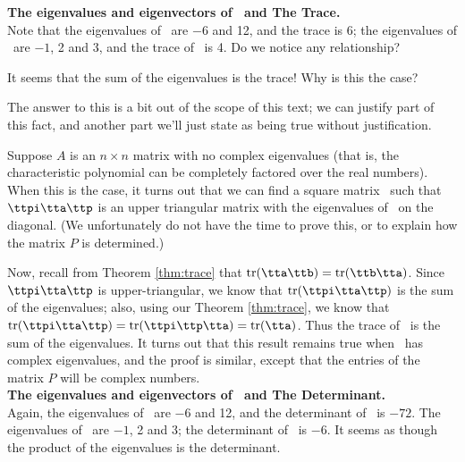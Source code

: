 
\noindent \textsf{\textbf{The eigenvalues and eigenvectors of \tta\ and The Trace.}}\\

Note that the eigenvalues of \tta\ are $-6$ and 12, and the trace is 6; the eigenvalues of \ttb\ are $-1$, 2 and 3, and the trace of \ttb\ is 4. Do we notice any relationship? 

It seems that the sum of the eigenvalues is the trace! Why is this the case?

The answer to this is a bit out of the scope of this text; we can justify part of this fact, and another part we'll just state as being true without justification. 

Suppose $A$ is an $n\times n$ matrix with no complex eigenvalues (that is, the characteristic polynomial can be completely factored over the real numbers). When this is the case, it turns out that we can find a square matrix \ttp\ such that $\ttpi\tta\ttp$ is an upper triangular matrix with the eigenvalues of \tta\ on the diagonal. (We unfortunately do not have the time to prove this, or to explain how the matrix $P$ is determined.)


Now, recall from Theorem \ref{thm:trace} that $\tr(\tta\ttb) = \tr(\ttb\tta)$. Since $\ttpi\tta\ttp$ is upper-triangular, we know that $\tr(\ttpi\tta\ttp)$ is the sum of the eigenvalues; also, using our Theorem \ref{thm:trace}, we know that $\tr(\ttpi\tta\ttp) =  \tr(\ttpi\ttp\tta) =  \tr(\tta)$. Thus the trace of \tta\ is the sum of the eigenvalues. It turns out that this result remains true when \tta\ has complex eigenvalues, and the proof is similar, except that the entries of the matrix $P$ will be complex numbers.\\

\noindent \textsf{\textbf{The eigenvalues and eigenvectors of \tta\ and The Determinant.}}\\

Again, the eigenvalues of \tta\ are $-6$ and 12, and the determinant of \tta\ is 
$-72$. The eigenvalues of \ttb\ are $-1$, 2 and 3; the determinant of \ttb\ is $-6$. It seems as though the product of the eigenvalues is the determinant.

